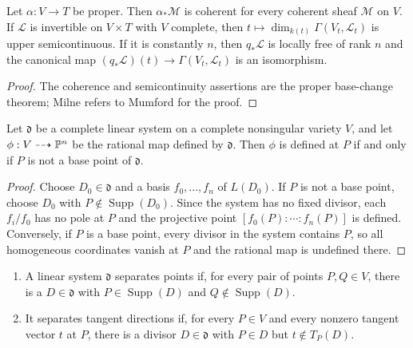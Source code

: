 \begin{lemma}
\label{lem:milne-5-15}

Let $\alpha:V\to T$ be proper.  Then $\alpha_*\mathcal M$ is coherent for
every coherent sheaf $\mathcal M$ on $V$.  If $\mathcal L$ is invertible on
$V\times T$ with $V$ complete, then $t\mapsto\dim_{k(t)}\Gamma(V_t,\mathcal
L_t)$ is upper semicontinuous.  If it is constantly $n$, then $q_*\mathcal L$
is locally free of rank $n$ and the canonical map
$(q_*\mathcal L)(t)\to\Gamma(V_t,\mathcal L_t)$ is an isomorphism.
\end{lemma}

\begin{proof}
The coherence and semicontinuity assertions are the proper base-change theorem;
Milne refers to Mumford for the proof.
\end{proof}
\begin{proposition}
\label{prop:milne-6-1}

Let $\mathfrak d$ be a complete linear system on a complete nonsingular variety
$V$, and let $\phi:V\dashrightarrow\mathbb{P}^n$ be the rational map defined by
$\mathfrak d$.  Then $\phi$ is defined at $P$ if and only if $P$ is not a base
point of $\mathfrak d$.
\end{proposition}

\begin{proof}
Choose $D_0\in\mathfrak d$ and a basis $f_0,\ldots,f_n$ of $L(D_0)$.  If
$P$ is not a base point, choose $D_0$ with $P\notin\operatorname{Supp}(D_0)$.
Since the system has no fixed divisor, each $f_i/f_0$ has no pole at $P$ and
the projective point $[f_0(P):\cdots:f_n(P)]$ is defined.  Conversely, if $P$
is a base point, every divisor in the system contains $P$, so all homogeneous
coordinates vanish at $P$ and the rational map is undefined there.
\end{proof}

\begin{definition}
\label{def:milne-6-2}

\begin{enumerate}
\item A linear system $\mathfrak d$ separates points if, for every pair of
points $P,Q\in V$, there is a $D\in\mathfrak d$ with
$P\in\operatorname{Supp}(D)$ and $Q\notin\operatorname{Supp}(D)$.
\item It separates tangent directions if, for every $P\in V$ and every
nonzero tangent vector $t$ at $P$, there is a divisor $D\in\mathfrak d$ with
$P\in D$ but $t\notin T_P(D)$.
\end{enumerate}
\end{definition}

